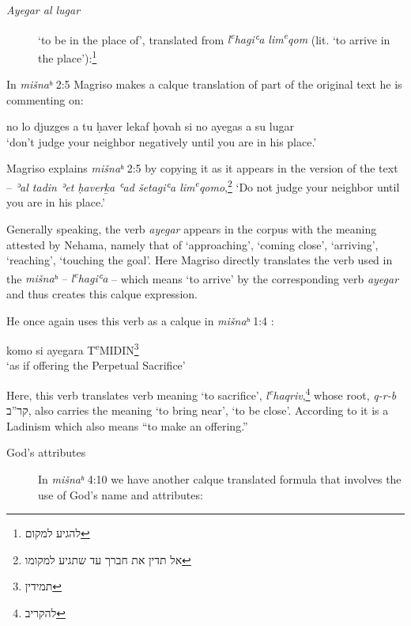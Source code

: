 \documentclass[output=paper,colorlinks,citecolor=brown,babel,arabicfont]{langscibook}
\begin{document}
\begin{description}

\item[\textit{Ayegar al lugar}] `to be in the place of', translated from  \textit{l\textsuperscript{e}hagiʿa lim\textsuperscript{e}qom} (lit. `to arrive in the place'):\footnote{\texthebrew{להגיע למקום}}
\end{description}

In \textit{mišnaʰ} 2:5 Magriso makes a calque translation of part of the original  text he is commenting on:

\ea\label{ch3.7.ex.n27}
no lo djuzges a tu ḥaver lekaf ḥovah si no ayegas a su lugar \\
`don't judge your neighbor negatively until you are in his place.'
\z

Magriso explains \textit{mišnaʰ} 2:5 by copying it as it appears in the  version of the text -- \textit{ʾal tadin ʾet ḥaver\b{k}a ʿad šetagiʿa lim\textsuperscript{e}qomo},\footnote{\texthebrew{אל תדין את חברך עד שתגיע למקומו}} `Do not judge your neighbor until you are in his place.'

Generally speaking, the verb \textit{ayegar} appears in the corpus with the meaning attested by Nehama, namely that of `approaching', `coming close', `arriving', `reaching', `touching the goal'. Here Magriso directly translates the  verb used in the \textit{mišnaʰ -- l\textsuperscript{e}hagiʿa} -- which means `to arrive' by the corresponding verb \textit{ayegar} and thus creates this calque expression. 

He once again uses this verb as a calque in \textit{mišnaʰ} 1:4 :

\ea\label{ch3.7.ex.n28}
komo si	ayegara	 T\textsuperscript{e}MIDIN\footnote{\texthebrew{תמידין}} \\
`as if offering the Perpetual Sacrifice'
\z


Here, this verb translates  verb meaning `to sacrifice', \textit{l\textsuperscript{e}haqriv},\footnote{\texthebrew{להקריב}} whose root, \textit{q-r-b} \texthebrew{קר''ב}, also carries the meaning `to bring near', `to be close'. According to \citet[429]{schwarzwald_rodrigue1989b} it is a Ladinism which also means ``to make an offering.'' 


\begin{description}

\item[God's attributes]

In \textit{mišnaʰ} 4:10 we have another calque translated formula that involves the use of God's name and attributes: 
\end{description}
\end{document}
